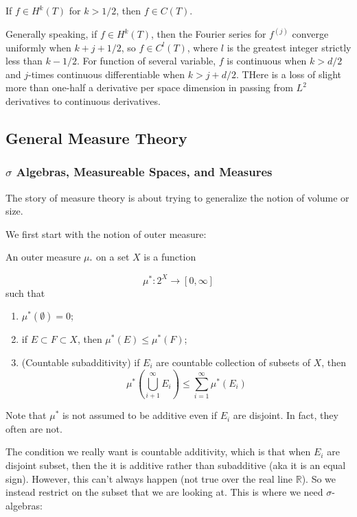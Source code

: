 \documentclass[main.tex]{subfiles}
\begin{document}
\begin{theorem}
If $f \in H^k(T)$ for $k > 1/2$, then $f \in C(T)$.
\end{theorem}

Generally speaking, if $f \in H^k(T)$, then the Fourier series for $f^{(j)}$ converge uniformly when $k + j + 1/2$, so $f \in C^l(T)$, where $l$ is the greatest integer strictly less than $k - 1/2$. For function of several variable, $f$ is continuous when $k > d/2$ and $j$-times continuous differentiable when $k > j + d/2$. THere is a loss of slight more than one-half a derivative per space dimension in passing from $L^2$ derivatives to continuous derivatives.

\subsection{General Measure Theory}

\subsubsection{$\sigma$ Algebras, Measureable Spaces, and Measures}
The story of measure theory is about trying to generalize the notion of volume or size. 

We first start with the notion of outer measure:

\begin{definition}
An outer measure $\mu_^*$ on a set $X$ is a function 

$$
\mu^* : 2^X \rightarrow [0, \infty]
$$ 
such that 
\begin{enumerate}
    \item $\mu^*(\emptyset) = 0$;
    \item if $E \subset F \subset X$, then $\mu^*(E) \leq \mu^*(F)$;
    \item (Countable subadditivity) if $E_i$ are countable collection of subsets of $X$, then 
    $$
    \mu^*(\bigcup_{i + 1} ^{\infty} E_i)\leq \sum_{i = 1} ^{\infty} \mu^*(E_i)
    $$
\end{enumerate}
\end{definition}
Note that $\mu^*$ is not assumed to be additive even if ${E_i}$ are disjoint. In fact, they often are not.

The condition we really want is countable additivity, which is that when $E_i$ are disjoint subset, then the it is additive rather than subadditive (aka it is an equal sign). However, this can't always happen (not true over the real line $\mathbb{R}$). So we instead restrict on the subset that we are looking at. This is where we need $\sigma$-algebras:
\end{document}
